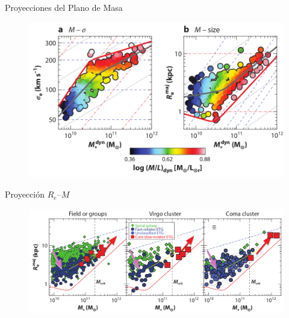 \documentclass[xcolor=dvipsnames,4pt]{beamer}
\newenvironment{changemargin}[2]{%
  \begin{list}{}{%
    \setlength{\topsep}{0pt}%
    \setlength{\leftmargin}{#1}%
    \setlength{\rightmargin}{#2}%
    \setlength{\listparindent}{\parindent}%
    \setlength{\itemindent}{\parindent}%
    \setlength{\parsep}{\parskip}%
  }%
\item[]}{\end{list}}
\begin{document}
\begin{frame}{Proyecciones del Plano de Masa}
\begin{changemargin}{-1cm}{-1cm}
\begin{figure}
\centering
\includegraphics[scale=0.8]{img/r_m_pred.png}
\end{figure}
\end{changemargin}
\end{frame}

\begin{frame}{Proyección $R_e$--$M$}
\begin{changemargin}{-1cm}{-1cm}
\begin{figure}
\centering
\includegraphics[scale=0.75]{img/r_m_clusters.png}
\end{figure}
\end{changemargin}
\end{frame}
\end{document}
